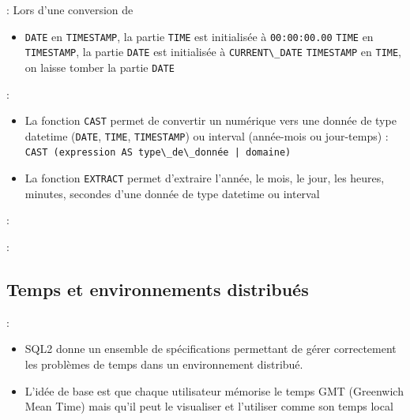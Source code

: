 \documentclass[10pt]{beamer}
\begin{document}
\begin{frame}{\secname : \subsecname}
    Lors d'une conversion de
    \begin{itemize}
        \item \lstinline[language=plsql]!DATE! en \lstinline[language=plsql]!TIMESTAMP!, la partie \lstinline[language=plsql]!TIME! est initialisée à \lstinline[language=plsql]!00:00:00.00!
              \lstinline[language=plsql]!TIME! en \lstinline[language=plsql]!TIMESTAMP!, la partie \lstinline[language=plsql]!DATE! est initialisée à \lstinline[language=plsql]!CURRENT\_DATE!
              \lstinline[language=plsql]!TIMESTAMP! en \lstinline[language=plsql]!TIME!, on laisse tomber la partie \lstinline[language=plsql]!DATE!
    \end{itemize}
\end{frame}

\begin{frame}{\secname : \subsecname}

    \begin{itemize}
        \item  La fonction \lstinline[language=plsql]!CAST! permet de convertir un numérique vers une donnée de type datetime (\lstinline[language=plsql]!DATE!, \lstinline[language=plsql]!TIME!, \lstinline[language=plsql]!TIMESTAMP!) ou interval (année-mois ou jour-temps) : \lstinline[language=bnf]!CAST (expression AS type\_de\_donnée | domaine)!
        \item La fonction \lstinline[language=plsql]!EXTRACT! permet d'extraire l'année, le mois, le jour, les heures, minutes, secondes d'une donnée de type datetime ou interval
    \end{itemize}
    
\end{frame}

\begin{frame}{\secname : \subsecname}
    
\end{frame}

\begin{frame}{\secname : \subsecname}
    
\end{frame}

\subsection{Temps et environnements distribués}
\begin{frame}{\secname : \subsecname}
    \begin{itemize}
        \item SQL2 donne un ensemble de spécifications permettant de gérer correctement les problèmes de temps dans un environnement distribué.
        \item L'idée de base est que chaque utilisateur mémorise le temps GMT (Greenwich Mean Time) mais qu'il peut le visualiser et l'utiliser comme son temps local
    \end{itemize}
\end{frame}
\end{document}
